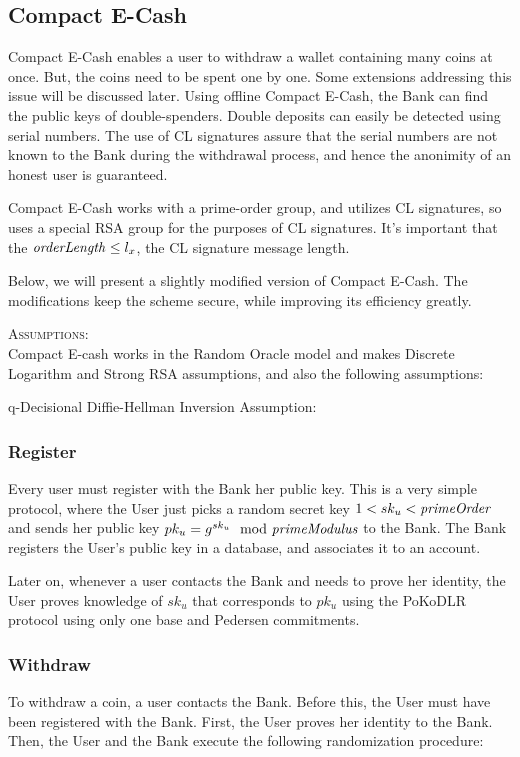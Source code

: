 \subsection{Compact E-Cash}

Compact E-Cash \cite{chlCOMPACT} enables a user to withdraw a wallet containing many coins at once. But, the coins need to be spent one by one. Some extensions addressing this issue will be discussed later. Using offline Compact E-Cash, the Bank can find the public keys of double-spenders. Double deposits can easily be detected using serial numbers. The use of CL signatures assure that the serial numbers are not known to the Bank during the withdrawal process, and hence the anonimity of an honest user is guaranteed.

Compact E-Cash works with a prime-order group, and utilizes CL signatures, so uses a special RSA group for the purposes of CL signatures. It's important that the $\mathit{orderLength} \leq l_x$, the CL signature message length.

Below, we will present a slightly modified version of Compact E-Cash. The modifications keep the scheme secure, while improving its efficiency greatly.


\textsc{Assumptions}:\\
Compact E-cash works in the Random Oracle model and makes Discrete Logarithm and Strong RSA assumptions, and also the following assumptions:

q-Decisional Diffie-Hellman Inversion Assumption:



\subsubsection{Register}
Every user must register with the Bank her public key. This is a very simple protocol, where the User just picks a random secret key $ 1 < sk_u < \mathit{primeOrder} $ and sends her public key $ pk_u = g^{sk_u} \mod {\mathit{primeModulus}} $ to the Bank. The Bank registers the User's public key in a database, and associates it to an account.

Later on, whenever a user contacts the Bank and needs to prove her identity, the User proves knowledge of $sk_u$ that corresponds to $pk_u$ using the PoKoDLR protocol using only one base and Pedersen commitments.

\subsubsection{Withdraw}
To withdraw a coin, a user contacts the Bank. Before this, the User must have been registered with the Bank. First, the User proves her identity to the Bank. Then, the User and the Bank execute the following randomization procedure:


